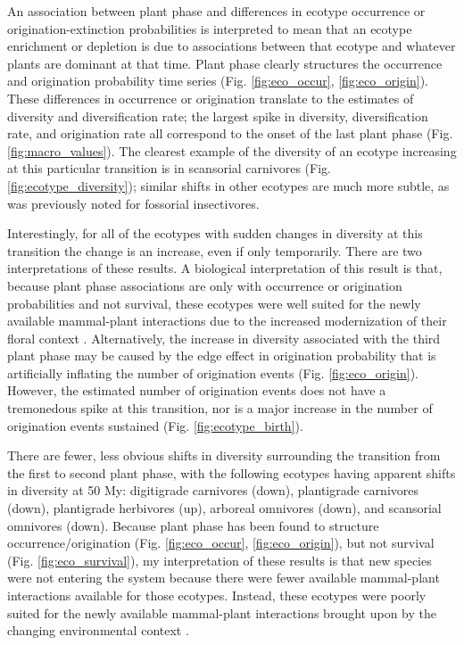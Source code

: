 \documentclass[12pt,letterpaper]{article}
\begin{document}
An association between plant phase and differences in ecotype occurrence or origination-extinction probabilities is interpreted to mean that an ecotype enrichment or depletion is due to associations between that ecotype and whatever plants are dominant at that time. Plant phase clearly structures the occurrence and origination probability time series (Fig. \ref{fig:eco_occur}, \ref{fig:eco_origin}). These differences in occurrence or origination translate to the estimates of diversity and diversification rate; the largest spike in diversity, diversification rate, and origination rate all correspond to the onset of the last plant phase (Fig. \ref{fig:macro_values}). The clearest example of the diversity of an ecotype increasing at this particular transition is in scansorial carnivores (Fig. \ref{fig:ecotype_diversity}); similar shifts in other ecotypes are much more subtle, as was previously noted for fossorial insectivores. 

Interestingly, for all of the ecotypes with sudden changes in diversity at this transition the change is an increase, even if only temporarily. There are two interpretations of these results. A biological interpretation of this result is that, because plant phase associations are only with occurrence or origination probabilities and not survival, these ecotypes were well suited for the newly available mammal-plant interactions due to the increased modernization of their floral context \citep{Graham2011a}. Alternatively, the increase in diversity associated with the third plant phase may be caused by the edge effect in origination probability that is artificially inflating the number of origination events (Fig. \ref{fig:eco_origin}). However, the estimated number of origination events does not have a tremonedous spike at this transition, nor is a major increase in the number of origination events sustained (Fig. \ref{fig:ecotype_birth}).

There are fewer, less obvious shifts in diversity surrounding the transition from the first to second plant phase, with the following ecotypes having apparent shifts in diversity at 50 My: digitigrade carnivores (down), plantigrade carnivores (down), plantigrade herbivores (up), arboreal omnivores (down), and scansorial omnivores (down). Because plant phase has been found to structure occurrence/origination (Fig. \ref{fig:eco_occur}, \ref{fig:eco_origin}), but not survival (Fig. \ref{fig:eco_survival}), my interpretation of these results is that new species were not entering the system because there were fewer available mammal-plant interactions available for those ecotypes. Instead, these ecotypes were poorly suited for the newly available mammal-plant interactions brought upon by the changing environmental context \citep{Graham2011a}.
\end{document}
